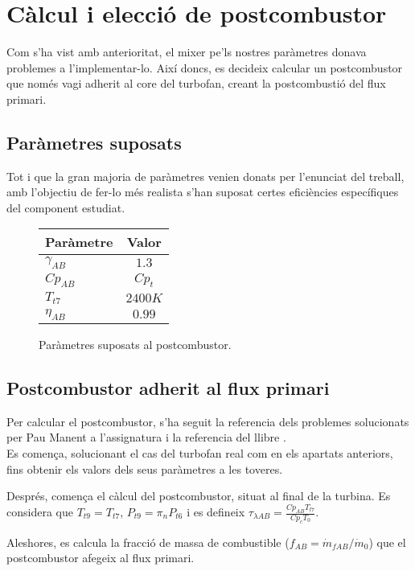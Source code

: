 \clearpage
\section{Càlcul i elecció de postcombustor}
Com s'ha vist amb anterioritat, el mixer pe'ls nostres paràmetres donava problemes a l'implementar-lo. Així doncs, es decideix calcular un postcombustor que només vagi adherit al core del turbofan, creant la postcombustió del flux primari.

\subsection{Paràmetres suposats }
Tot i que la gran majoria de paràmetres venien donats per l'enunciat del treball, amb l'objectiu de fer-lo més realista s'han suposat certes eficiències específiques del component estudiat.

\begin{figure}[H]
	\centering
	\begin{tabular}{lc}
		\toprule[3pt]
		\textbf{Paràmetre}&\textbf{Valor}\\
		\midrule[1pt]
		$\gamma_{AB}$ & $1.3$\\
		$ Cp_{AB}$ & $Cp_t$\\
		$T_{t7}$ & $2400K$\\
		$\eta_{AB}$ & $0.99$\\
		
		\bottomrule[2pt]
	\end{tabular}
	\label{ABparam}
	\caption{Paràmetres suposats al postcombustor.}
\end{figure}


\subsection{Postcombustor adherit al flux primari}
Per calcular el postcombustor, s'ha seguit la referencia dels problemes solucionats per Pau Manent a l'assignatura i la referencia del llibre \cite{mattingly}.\\

\noindent Es comença, solucionant el cas del turbofan real com en els apartats anteriors, fins obtenir els valors dels seus paràmetres a les toveres.

\noindent Després, comença el càlcul del postcombustor, situat al final de la turbina. Es considera que $T_{t9} = T_{t7}$, $P_{t9}=\pi_nP_{t6}$ i es defineix $\tau_{\lambda AB} = \frac{Cp_{AB}T_{t7}}{Cp_cT_0}$.

\noindent Aleshores, es calcula la fracció de massa de combustible ($f_{AB}=\dot{m}_{fAB}/\dot{m}_0$) que el postcombustor afegeix al flux primari.


